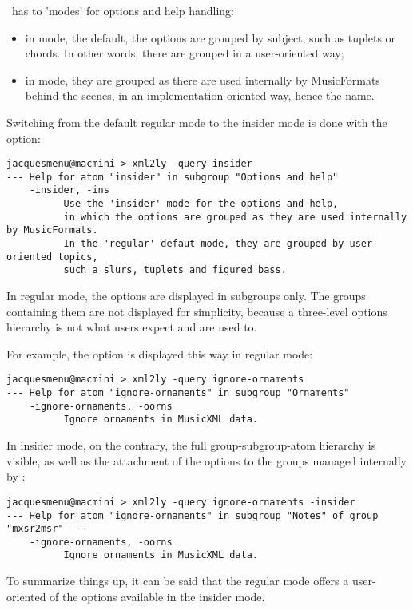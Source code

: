 \mf\ has to 'modes' for options and help handling:
\begin{itemize}
\item in  mode, the default, the options are grouped by subject, such as tuplets or chords. In other words, there are grouped in a user-oriented way;
\item in  mode, they are grouped as there are used internally by MusicFormats behind the scenes, in an implementation-oriented way, hence the name.
\end{itemize}

Switching from the default regular mode to the insider mode is done with the  option:
\begin{lstlisting}[language=Terminal]
jacquesmenu@macmini > xml2ly -query insider
--- Help for atom "insider" in subgroup "Options and help"
    -insider, -ins
          Use the 'insider' mode for the options and help,
          in which the options are grouped as they are used internally by MusicFormats.
          In the 'regular' defaut mode, they are grouped by user-oriented topics,
          such a slurs, tuplets and figured bass.
\end{lstlisting}

In regular mode, the options are displayed in subgroups only. The groups containing them are not displayed for simplicity, because a three-level options hierarchy is not what users expect and are used to.

For example, the  option is displayed this way in regular mode:
\begin{lstlisting}[language=Terminal]
jacquesmenu@macmini > xml2ly -query ignore-ornaments
--- Help for atom "ignore-ornaments" in subgroup "Ornaments"
    -ignore-ornaments, -oorns
          Ignore ornaments in MusicXML data.
\end{lstlisting}

In insider mode, on the contrary, the full group-subgroup-atom hierarchy is visible, as well as the attachment of the options to the groups managed internally by \mf:
\begin{lstlisting}[language=Terminal]
jacquesmenu@macmini > xml2ly -query ignore-ornaments -insider
--- Help for atom "ignore-ornaments" in subgroup "Notes" of group "mxsr2msr" ---
    -ignore-ornaments, -oorns
          Ignore ornaments in MusicXML data.
\end{lstlisting}

To summarize things up, it can be said that the regular mode offers a user-oriented  of the options available in the insider mode.

